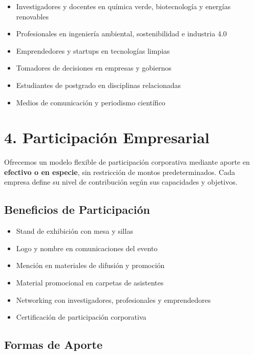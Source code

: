 \documentclass[11pt,a4paper]{article}
\begin{document}
\begin{itemize}\setlength{\itemsep}{0.1cm}
\item Investigadores y docentes en química verde, biotecnología y energías renovables
\item Profesionales en ingeniería ambiental, sostenibilidad e industria 4.0
\item Emprendedores y startups en tecnologías limpias
\item Tomadores de decisiones en empresas y gobiernos
\item Estudiantes de postgrado en disciplinas relacionadas
\item Medios de comunicación y periodismo científico
\end{itemize}

\vspace{0.2cm}

\section*{4. Participación Empresarial}

Ofrecemos un modelo flexible de participación corporativa mediante aporte en \textbf{efectivo o en especie}, sin restricción de montos predeterminados. Cada empresa define su nivel de contribución según sus capacidades y objetivos.

\subsection*{Beneficios de Participación}

\begin{itemize}\setlength{\itemsep}{0.08cm}
\item Stand de exhibición con mesa y sillas
\item Logo y nombre en comunicaciones del evento
\item Mención en materiales de difusión y promoción
\item Material promocional en carpetas de asistentes
\item Networking con investigadores, profesionales y emprendedores
\item Certificación de participación corporativa
\end{itemize}

\subsection*{Formas de Aporte}
\end{document}
